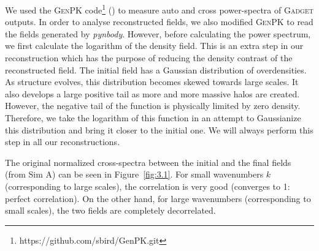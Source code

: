 We used the \textsc{GenPK} code\footnote{https://github.com/sbird/GenPK.git} (\cite{2017ascl.soft06006B}) to measure auto and cross power-spectra of \textsc{Gadget} outputs. In order to analyse reconstructed fields, we also modified \textsc{GenPK} to read the fields generated by \textit{pynbody}. However, before calculating the power spectrum, we first calculate the logarithm of the density field. This is an extra step in our reconstruction which has the purpose of reducing the density contrast of the reconstructed field. The initial field has a Gaussian distribution of overdensities. As structure evolves, this distribution becomes skewed towards large scales. It also develops a large positive tail as more and more massive halos are created. However, the negative tail of the function is physically limited by zero density. Therefore, we take the logarithm of this function in an attempt to Gaussianize this distribution and bring it closer to the initial one. We will always perform this step in all our reconstructions.

The original normalized cross-spectra between the initial and the final fields (from Sim A) can be seen in Figure~\ref{fig:3.1}. For small wavenumbers $k$ (corresponding to large scales), the correlation is very good (converges to 1: perfect correlation). On the other hand, for large wavenumbers (corresponding to small scales), the two fields are completely decorrelated. 

